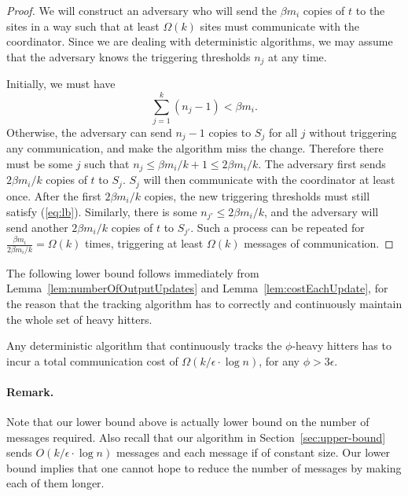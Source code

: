 \documentclass[10pt]{article}
\newcommand{\eps}{\epsilon}
\begin{document}
\begin{proof}
  We will construct an adversary who will send the $\beta m_i$ copies of
  $t$ to the sites in a way such that at least $\Omega(k)$ sites must
  communicate with the coordinator.  Since we are dealing with
  deterministic algorithms, we may assume that the adversary knows the
  triggering thresholds $n_j$ at any time.

Initially, we must have
\begin{equation}
\label{eq:lb}\sum_{j=1}^{k} (n_j-1) <
  \beta m_i.
\end{equation}
Otherwise, the adversary can send $n_j-1$ copies to $S_j$ for all $j$
without triggering any communication, and make the algorithm miss the
change.  Therefore there must be some $j$ such that $n_j \le \beta m_i / k
+ 1 \le 2 \beta m_i/k$.  The adversary first sends $2\beta m_i/k$ copies of
$t$ to $S_j$.  $S_j$ will then communicate with the coordinator at least
once.  After the first $2\beta m_i/k$ copies, the new triggering thresholds
must still satisfy (\ref{eq:lb}).  Similarly, there is some $n_{j'} \le
2\beta m_i /k$, and the adversary will send another $2\beta m_i /k$ copies
of $t$ to $S_{j'}$.  Such a process can be repeated for $\frac{\beta
  m_i}{2\beta m_i/k} = \Omega(k)$ times, triggering at least $\Omega(k)$
messages of communication.
\end{proof}

The following lower bound follows immediately from
Lemma~\ref{lem:numberOfOutputUpdates} and
Lemma~\ref{lem:costEachUpdate}, for the reason that the tracking
algorithm has to correctly and continuously maintain the whole set
of heavy hitters.

\begin{theorem}
\label{thm:lowerbound-hh}
Any deterministic algorithm that continuously tracks the $\phi$-heavy
hitters has to incur a total communication cost of $\Omega(k/\eps\cdot \log
n)$, for any $\phi>3\eps$.
\end{theorem}

\paragraph{Remark.}
Note that our lower bound above is actually lower bound on the number of
messages required.  Also recall that our algorithm in
Section~\ref{sec:upper-bound} sends $O(k/\eps\cdot\log n)$ messages and
each message if of constant size.  Our lower bound implies that one cannot
hope to reduce the number of messages by making each of them longer.
\end{document}
